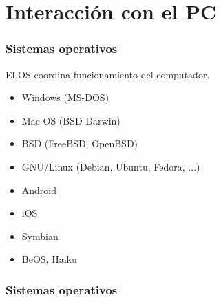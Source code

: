 \documentclass[14pt,aspectratio=169,xcolor=dvipsnames]{beamer}
\begin{document}
\section{Interacción con el PC}
\begin{frame}\frametitle{Sistemas operativos}
El OS coordina funcionamiento del computador. \pause
    \begin{itemize}
        \item<+-> Windows (MS-DOS)
        \item<+-> Mac OS (BSD Darwin)
        \item<+-> BSD (FreeBSD, OpenBSD)
        \item<+-> GNU/Linux (Debian, Ubuntu, Fedora, $\hdots$)
        \item<+-> Android
        \item<+-> iOS
        \item<+-> Symbian
        \item<+-> BeOS, Haiku
    \end{itemize}
\end{frame}
\begin{frame}\frametitle{Sistemas operativos}
    \begin{center}
    \end{center}
\end{frame}
\end{document}
